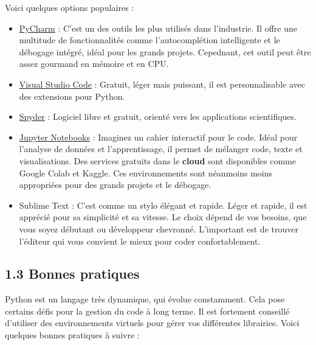 \documentclass[
]{article}
\begin{document}
Voici quelques options populaires :

\begin{itemize}
\item
  \href{https://www.jetbrains.com/pycharm/}{PyCharm} : C'est un des
  outils les plus utilisés dans l'industrie. Il offre une multitude de
  fonctionnalités comme l'autocomplétion intelligente et le débogage
  intégré, idéal pour les grands projets. Cepednant, cet outil peut être
  assez gourmand en mémoire et en CPU.
\item
  \href{https://code.visualstudio.com/}{Visual Studio Code} : Gratuit,
  léger mais puissant, il est personnalisable avec des extensions pour
  Python.
\item
  \href{https://www.spyder-ide.org/}{Spyder} : Logiciel libre et
  gratuit, orienté vers les applications scientifiques.
\item
  \href{https://jupyter.org/}{Jupyter Notebooks} : Imaginez un cahier
  interactif pour le code. Idéal pour l'analyse de données et
  l'apprentissage, il permet de mélanger code, texte et visualisations.
  Des services gratuits dans le \textbf{cloud} sont disponibles comme
  Google Colab et Kaggle. Ces environnements sont néanmoins moins
  appropriées pour des grands projets et le débogage.
\item
  Sublime Text : C'est comme un stylo élégant et rapide. Léger et
  rapide, il est apprécié pour sa simplicité et sa vitesse. Le choix
  dépend de vos besoins, que vous soyez débutant ou développeur
  chevronné. L'important est de trouver l'éditeur qui vous convient le
  mieux pour coder confortablement.
\end{itemize}

\subsection{\texorpdfstring{{1.3} Bonnes
pratiques}{1.3 Bonnes pratiques}}\label{bonnes-pratiques}

Python est un langage très dynamique, qui évolue constamment. Cela pose
certains défis pour la gestion du code à long terme. Il est fortement
conseillé d'utiliser des environnements virtuels pour gérer vos
différentes librairies. Voici quelques bonnes pratiques à suivre :
\end{document}
